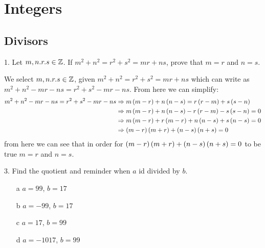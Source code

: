 \section{Integers}
\subsection{Divisors}
\begin{mdframed}[style=darkQuesion]
  1.    Let $m,n.r.s\in \mathbb{Z}$. If $m^2+n^2=r^2+s^2=mr+ns$, prove that $m=r$ and
  $n=s$.
\end{mdframed}

\begin{mdframed}[style=darkAnswer,frametitle={Joe Starr}]
  We select $m,n.r.s\in \mathbb{Z}$, given $m^2+n^2=r^2+s^2=mr+ns$ which can write
  as $m^2+n^2-mr-ns=r^2+s^2-mr-ns$. From here we can simplify:
  \begin{align*}
    m^2+n^2-mr-ns=r^2+s^2-mr-ns & \Rightarrow
    m\left(m-r\right)+n\left(n-s\right)=r\left(r-m\right)+s\left(s-n\right)                                             \\
                                & \Rightarrow m\left(m-r\right)+n\left(n-s\right)-r\left(r-m\right)-s\left(s-n\right)=0 \\
                                & \Rightarrow m\left(m-r\right)+r\left(m-r\right)+n\left(n-s\right)+s\left(n-s\right)=0 \\
                                & \Rightarrow \left(m-r\right)\left(m+r\right)+\left(n-s\right)\left(n+s\right)=0       \\
  \end{align*}
  from here we can see that in order for $\left(m-r\right)\left(m+r\right)+\left(n-s\right)\left(n+s\right)=0$
  to be true $m=r$ and $n=s$.
\end{mdframed}
\newpage
\begin{mdframed}[style=darkQuesion]
  3.    Find the quotient and reminder when $a$ id divided by $b$.
  \begin{itemize}
    \item [a] {$a=99$, $b=17$}
    \item [b] {$a=-99$, $b=17$}
    \item [c] {$a=17$, $b=99$}
    \item [d] {$a=-1017$, $b=99$}
  \end{itemize}

\end{mdframed}

